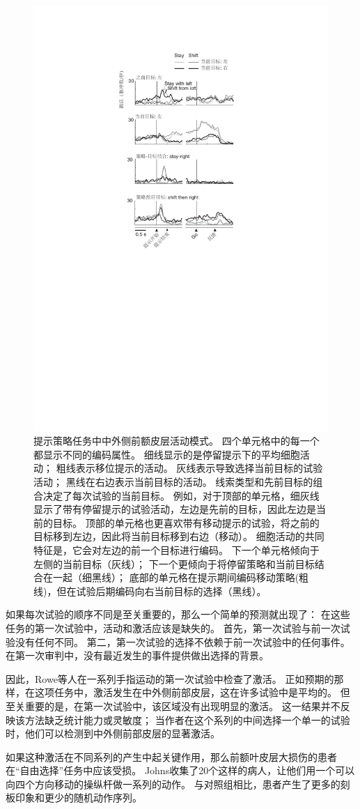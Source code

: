 \begin{figure}
	\centering
	\includegraphics[width=0.5\linewidth]{chap6/6_11}
	\caption{提示策略任务中中外侧前额皮层活动模式。
		四个单元格中的每一个都显示不同的编码属性。
		细线显示的是停留提示下的平均细胞活动；
		粗线表示移位提示的活动。
		灰线表示导致选择当前目标的试验活动；
		黑线在右边表示当前目标的活动。
		线索类型和先前目标的组合决定了每次试验的当前目标。
		例如，对于顶部的单元格，细灰线显示了带有停留提示的试验活动，左边是先前的目标，因此左边是当前的目标。
		顶部的单元格也更喜欢带有移动提示的试验，将之前的目标移到左边，因此将当前目标移到右边（移动）。
		细胞活动的共同特征是，它会对左边的前一个目标进行编码。
		下一个单元格倾向于左侧的当前目标（灰线）；
		下一个更倾向于将停留策略和当前目标结合在一起（细黑线）；
		底部的单元格在提示期间编码移动策略(粗线)，但在试验后期编码向右当前目标的选择（黑线）\cite{tsujimoto2011comparison}。}
	\label{fig:6_11}
\end{figure}


如果每次试验的顺序不同是至关重要的，那么一个简单的预测就出现了：
在这些任务的第一次试验中，活动和激活应该是缺失的。
首先，第一次试验与前一次试验没有任何不同。
第二，第一次试验的选择不依赖于前一次试验中的任何事件。
在第一次审判中，没有最近发生的事件提供做出选择的背景。


因此，Rowe等人\cite{rowe2010action}在一系列手指运动的第一次试验中检查了激活。
正如预期的那样，在这项任务中，激活发生在中外侧前部皮层，这在许多试验中是平均的。
但至关重要的是，在第一次试验中，该区域没有出现明显的激活。
这一结果并不反映该方法缺乏统计能力或灵敏度；
当作者在这个系列的中间选择一个单一的试验时，他们可以检测到中外侧前部皮层的显著激活。


如果这种激活在不同系列的产生中起关键作用，那么前额叶皮层大损伤的患者在“自由选择”任务中应该受损。
Johns\cite{johns1996effects}收集了20个这样的病人，让他们用一个可以向四个方向移动的操纵杆做一系列的动作。
与对照组相比，患者产生了更多的刻板印象和更少的随机动作序列。


